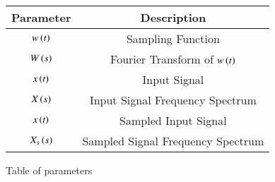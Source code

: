 \renewcommand\thetable{1}
\begin{tabular}{|c|c|}
    \hline 
    \textbf{Parameter}&\textbf{Description} \\
    \hline
    $w\left(t\right)$ & Sampling Function \\
    \hline
	$W\left(s\right)$ & Fourier Transform of $w\left(t\right)$ \\
    \hline
    $x\left(t\right)$ & Input Signal \\
    \hline
    $X\left(s\right)$ & Input Signal Frequency Spectrum \\
    \hline
    $x\left(t\right)$ & Sampled Input Signal \\
    \hline
    $X_s\left(s\right)$ & Sampled Signal Frequency Spectrum \\
    \hline
\end{tabular}

\caption{Table of parameters}
\label{Table:1}

